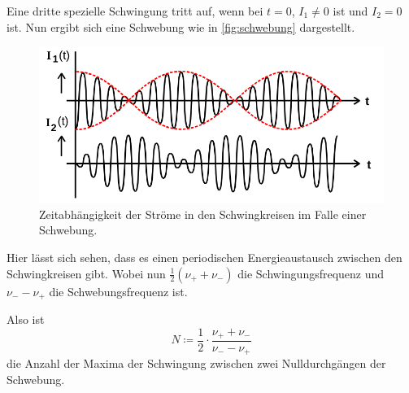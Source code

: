 Eine dritte spezielle Schwingung tritt auf, wenn bei $t=0$, $I_1 \neq 0$ ist und $I_2 = 0$ ist. Nun ergibt sich eine Schwebung wie in \autoref{fig:schwebung} dargestellt.
\begin{figure}
    \centering
    \includegraphics[width=\textwidth/2]{images/schwebung.png}
    \caption{Zeitabhängigkeit der Ströme in den Schwingkreisen im Falle einer Schwebung. \cite{V355}}
    \label{fig:schwebung}
\end{figure}

Hier lässt sich sehen, dass es einen periodischen Energieaustausch zwischen den Schwingkreisen gibt. 
Wobei nun $\frac{1}{2} (\nu _+ + \nu _-)$ die Schwingungsfrequenz und $\nu _- - \nu _+$ die Schwebungsfrequenz ist.\cite{V355}

Also ist 
\begin{equation}
    \label{eq:extrema}
    N \coloneq \frac{1}{2} \cdot \frac{ \nu _+ + \nu _-}{\nu _- - \nu _+}
\end{equation}
die Anzahl der Maxima der Schwingung zwischen zwei Nulldurchgängen der Schwebung.